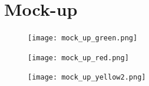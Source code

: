 \section{Mock-up}

\begin{figure}[ht]
    \texttt{[image: mock\_up\_green.png]}
\end{figure}

\begin{figure}[ht]
    \texttt{[image: mock\_up\_red.png]}
\end{figure}

\begin{figure}[ht]
    \texttt{[image: mock\_up\_yellow2.png]}
\end{figure}

